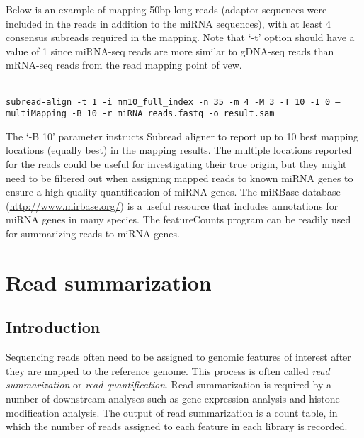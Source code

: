 \documentclass[12pt]{report}
\newcommand{\code}[1]{{\small\texttt{#1}}}
\newcommand{\Subread}{\textsf{Subread}}
\newcommand{\featureCounts}{\textsf{featureCounts}}
\begin{document}
Below is an example of mapping 50bp long reads (adaptor sequences were included in the reads in addition to the miRNA sequences), with at least 4 consensus subreads required in the mapping.
Note that `-t' option should have a value of 1 since miRNA-seq reads are more similar to gDNA-seq reads than mRNA-seq reads from the read mapping point of vew.

\code{\\
subread-align -t 1 -i mm10\_full\_index -n 35 -m 4 -M 3 -T 10 -I 0
--multiMapping -B 10 -r miRNA\_reads.fastq -o result.sam\\
}

The `-B 10' parameter instructs {\Subread} aligner to report up to 10 best mapping locations (equally best) in the mapping results.
The multiple locations reported for the reads could be useful for investigating their true origin, but they might need to be filtered out when assigning mapped reads to known miRNA genes to ensure a high-quality quantification of miRNA genes.
The miRBase database (\url{http://www.mirbase.org/}) is a useful resource that includes annotations for miRNA genes in many species.
The {\featureCounts} program can be readily used for summarizing reads to miRNA genes.



\chapter{Read summarization}

\section{Introduction}

Sequencing reads often need to be assigned to genomic features of interest after they are mapped to the reference genome.
This process is often called \emph{read summarization} or \emph{read quantification}.
Read summarization is required by a number of downstream analyses such as gene expression analysis and histone modification analysis.
The output of read summarization is a count table, in which the number of reads assigned to each feature in each library is recorded.
\end{document}
